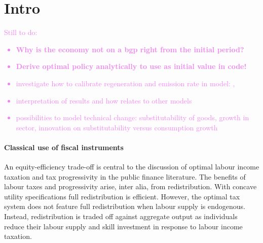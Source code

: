\section{Intro}





% 

\textcolor{violet}{Still to do:
\begin{itemize}
	\item \textbf{Why is the economy not on a bgp right from the initial period?}
	\item \textbf{Derive optimal policy analytically to use as initial value in code!}
	\item investigate how to calibrate regeneration and emission rate in model:  \cite{Hassler2016EnvironmentalMacroeconomics}, \cite{Rogelj2018MitigationDevelopment.} \checkmark
	\item interpretation of results and how relates to other models
	\item possibilities to model technical change: substitutability of goods, growth in sector, innovation on substitutability versus consumption growth
\end{itemize}
}
\paragraph{Classical use of fiscal instruments}
An equity-efficiency trade-off is central to the discussion of optimal labour income taxation and tax progressivity in the public finance literature.  The benefits of labour taxes and progressivity arise, inter alia, from redistribution. %
With concave utility specifications full redistribution is efficient. However, the optimal tax system does not feature full redistribution when labour supply is endogenous. Instead, redistribution is traded off against aggregate output as individuals reduce their labour supply and skill investment in response to labour income taxation. 

